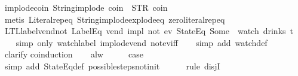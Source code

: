 \begin{isabellebody}
\endisatagproof
{\isafoldproof}%
%
\isadelimproof
\isanewline
%
\endisadelimproof
\isanewline
{}\isamarkupfalse%
\ implode{\isacharunderscore}coin{\isacharcolon}\ {\isachardoublequoteopen}String{\isachardot}implode\ {\isacharprime}{\isacharprime}coin{\isacharprime}{\isacharprime}\ {\isacharequal}\ STR\ {\isacharprime}{\isacharprime}coin{\isacharprime}{\isacharprime}{\isachardoublequoteclose}\isanewline
%
\isadelimproof
\ \ %
\endisadelimproof
%
\isatagproof
{}\isamarkupfalse%
\ {\isacharparenleft}metis\ Literal{\isachardot}rep{\isacharunderscore}eq\ String{\isachardot}implode{\isacharunderscore}explode{\isacharunderscore}eq\ zero{\isacharunderscore}literal{\isachardot}rep{\isacharunderscore}eq{\isacharparenright}%
\endisatagproof
{\isafoldproof}%
%
\isadelimproof
\isanewline
%
\endisadelimproof
\isanewline
{}\isamarkupfalse%
\ LTL{\isacharunderscore}label{\isacharunderscore}vend{\isacharunderscore}not{\isacharunderscore}{}{\isacharcolon}\ {\isachardoublequoteopen}{\isacharparenleft}{\isacharparenleft}LabelEq\ {\isacharprime}{\isacharprime}vend{\isacharprime}{\isacharprime}{\isacharparenright}\ impl\ {\isacharparenleft}not\ {\isacharparenleft}ev\ {\isacharparenleft}StateEq\ {\isacharparenleft}Some\ {}{\isacharparenright}{\isacharparenright}{\isacharparenright}{\isacharparenright}{\isacharparenright}\ {\isacharparenleft}watch\ drinks\ t{\isacharparenright}{\isachardoublequoteclose}\isanewline
%
\isadelimproof
\ \ %
\endisadelimproof
%
\isatagproof
{}\isamarkupfalse%
\ {\isacharparenleft}simp\ only{\isacharcolon}\ watch{\isacharunderscore}label\ implode{\isacharunderscore}vend\ not{\isacharunderscore}ev{\isacharunderscore}iff{\isacharparenright}\isanewline
\ \ \isamarkupfalse%
\ {\isacharparenleft}simp\ add{\isacharcolon}\ watch{\isacharunderscore}def{\isacharparenright}\isanewline
\ \ \isamarkupfalse%
\ clarify\isanewline
{}\isamarkupfalse%
{\isacharparenleft}coinduction{\isacharparenright}\isanewline
\ \ \isamarkupfalse%
\ alw\isanewline
\ \ \isamarkupfalse%
\ \isamarkupfalse%
\ {\isacharquery}case\isanewline
\ \ \ \ \isamarkupfalse%
\ {\isacharparenleft}simp\ add{\isacharcolon}\ StateEq{\isacharunderscore}def\ possible{\isacharunderscore}steps{\isacharunderscore}not{\isacharunderscore}init{\isacharparenright}\isanewline
\ \ \ \ \isamarkupfalse%
\ {\isacharparenleft}rule\ disjI{}{\isacharparenright}\isanewline
\ \ \ \ \isamarkupfalse%

\end{isabellebody}
